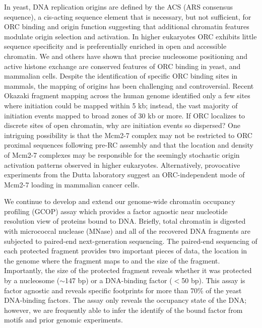 In yeast, DNA replication origins are defined by the ACS (ARS consensus sequence), a cis-acting sequence element that is necessary, but not sufficient, for ORC binding and origin function\citep{Breier2004-tw} suggesting that additional chromatin features modulate origin selection and activation.  In higher eukaryotes ORC exhibits little sequence specificity\citep{Vashee2003-xr} and is preferentially enriched in open and accessible chromatin\citep{MacAlpine2010-ju,Miotto2016-jt}.   We and others have shown that precise nucleosome positioning and active histone exchange are conserved features of ORC binding in yeast\citep{Eaton2010-fq,Berbenetz2010-hh}, \dros\citep{Liu2015-nr,MacAlpine2010-ju} and mammalian cells\citep{Lombrana2013-aw,Lubelsky2011-dj}.  Despite the identification of specific ORC binding sites in mammals\citep{Miotto2016-jt}, the mapping of origins has been challenging and controversial\citep{Prioleau2016-bj}.  Recent Okazaki fragment mapping across the human genome identified only a few sites where initiation could be mapped within 5 kb; instead, the vast majority of initiation events mapped to broad zones of 30 kb or more\citep{Petryk2016-rr}.  If ORC localizes to discrete sites of open chromatin\citep{MacAlpine2010-ju,Miotto2016-jt}, why are initiation events so dispersed?  One intriguing possibility is that the Mcm2-7 complex may not be restricted to ORC proximal sequences following pre-RC assembly and that the location and density of Mcm2-7 complexes may be responsible for the seemingly stochastic origin activation patterns observed in higher eukaryotes. Alternatively, provocative experiments from the Dutta laboratory suggest an ORC-independent mode of Mcm2-7 loading in mammalian cancer cells\citep{Shibata2016-uc}. 

We continue to develop and extend our genome-wide chromatin occupancy profiling (GCOP) assay which provides a factor agnostic near nucleotide resolution view of proteins bound to DNA\citep{}.  Briefly, total chromatin is digested with micrococcal nuclease (MNase) and all of the recovered DNA fragments are subjected to paired-end next-generation sequencing.  The paired-end sequencing of each protected fragment provides two important pieces of data, the location in the genome where the fragment maps to and the size of the fragment.  Importantly, the size of the protected fragment reveals whether it was protected by a nucleosome ($\sim$147 bp) or a DNA-binding factor ($<$50 bp). This assay is factor agnostic and reveals specific footprints for more than 70\% of the yeast DNA-binding factors\citep{Henikoff2011-vo}. The assay only reveals the occupancy state of the DNA; however, we are frequently able to  infer the identify of the bound factor from motifs\citep{} and prior genomic experiments\citep{many}.   

